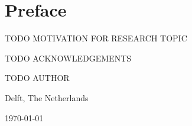 \chapter*{Preface}
TODO MOTIVATION FOR RESEARCH TOPIC

\vspace{1\baselineskip}

\noindent
TODO ACKNOWLEDGEMENTS

\vspace{1\baselineskip}

\noindent
TODO AUTHOR

\vspace{1\baselineskip}

\noindent
Delft, The Netherlands

\noindent
\today
